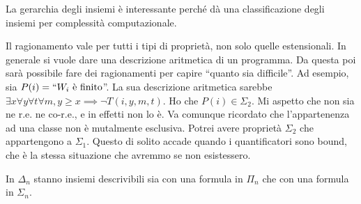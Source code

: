 La gerarchia degli insiemi è interessante perché dà una classificazione degli insiemi per
complessità computazionale.

Il ragionamento vale per tutti i tipi di proprietà, non solo quelle estensionali. In generale si
vuole dare una descrizione aritmetica di un programma. Da questa poi sarà possibile fare dei
ragionamenti per capire ``quanto sia difficile''. Ad esempio, sia $P(i) = ``W_{i} \text{ è
finito}$''. La sua
descrizione aritmetica sarebbe $\exists x \forall y \forall t \forall m, y \geq x \implies \lnot
T(i,y,m,t)$. Ho che $P(i) \in \Sigma_{2}$. Mi aspetto che non sia ne r.e. ne co-r.e., e in effetti non
lo è. Va comunque ricordato che l'appartenenza ad una classe non è mutalmente esclusiva. Potrei
avere proprietà $\Sigma_{2}$ che appartengono a $\Sigma_{1}$. Questo di solito accade quando i
quantificatori sono bound, che è la stessa situazione che avremmo se non esistessero.

In $\Delta_{n}$ stanno insiemi descrivibili sia con una formula in $\Pi_{n}$ che con una formula in
$\Sigma_{n}$.
